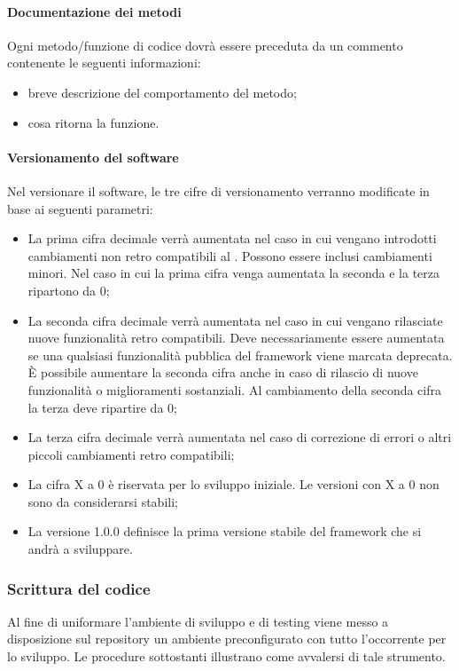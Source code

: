 \paragraph{Documentazione dei metodi}

Ogni metodo/funzione di codice dovrà essere preceduta da un commento contenente le seguenti informazioni:
\begin{itemize}
\item {} breve descrizione del comportamento del metodo;
\item {} cosa ritorna la funzione.
\end{itemize}



\paragraph{Versionamento del software}

Nel versionare il software, le tre cifre di versionamento verranno modificate in base ai seguenti parametri:
\begin{itemize}
\item La prima cifra decimale verrà aumentata nel caso in cui vengano introdotti cambiamenti non retro compatibili al . Possono essere inclusi cambiamenti minori. Nel caso in cui la prima cifra venga aumentata la seconda e la terza ripartono da 0;
\item La seconda cifra decimale verrà aumentata nel caso in cui vengano rilasciate nuove funzionalità retro compatibili. Deve necessariamente essere aumentata se una qualsiasi funzionalità pubblica del framework viene marcata deprecata. È possibile aumentare la seconda cifra anche in caso di rilascio di nuove funzionalità o miglioramenti sostanziali. Al cambiamento della seconda cifra la terza deve ripartire da 0;
\item La terza cifra decimale verrà aumentata nel caso di correzione di errori o altri piccoli cambiamenti retro compatibili;
\item La cifra X a 0 è riservata per lo sviluppo iniziale. Le versioni con X a 0 non sono da considerarsi stabili;
\item La versione 1.0.0 definisce la prima versione stabile del framework che si andrà a sviluppare.
\end{itemize}

\subsubsection{Scrittura del codice}
Al fine di uniformare l'ambiente di sviluppo e di testing viene messo a disposizione sul repository un ambiente preconfigurato con tutto l'occorrente per lo sviluppo.
Le procedure sottostanti illustrano come avvalersi di tale strumento.

